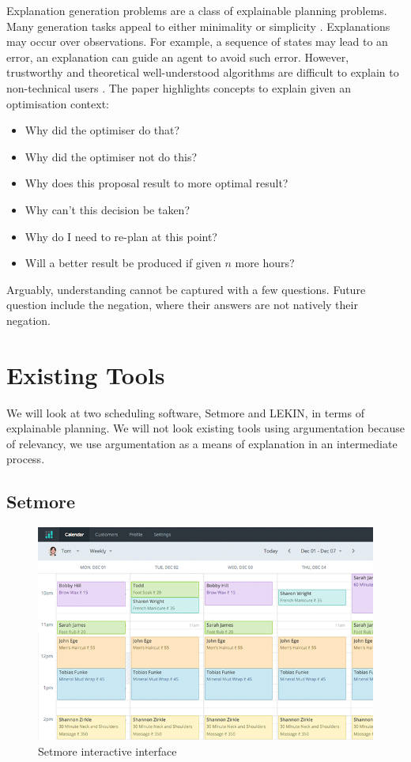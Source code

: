 Explanation generation problems are a class of explainable planning problems. Many generation tasks appeal to either minimality or simplicity \cite{pe}. Explanations may occur over observations. For example, a sequence of states may lead to an error, an explanation can guide an agent to avoid such error. However, trustworthy and theoretical well-understood algorithms are difficult to explain to non-technical users \cite{ep}. The paper highlights concepts to explain given an optimisation context:
\begin{itemize}
	\item Why did the optimiser do that?
	\item Why did the optimiser not do this?
	\item Why does this proposal result to more optimal result?
	\item Why can't this decision be taken?
	\item Why do I need to re-plan at this point?
	\item Will a better result be produced if given $n$ more hours?
\end{itemize}

Arguably, understanding cannot be captured with a few questions. Future question include the negation, where their answers are not natively their negation.

\section{Existing Tools}

We will look at two scheduling software, Setmore and LEKIN, in terms of explainable planning. We will not look existing tools using argumentation because of relevancy, we use argumentation as a means of explanation in an intermediate process.

\subsection{Setmore}

\begin{figure}[H]
	\begin{center}
		\includegraphics[width=\linewidth]{figures/setmore_gui.png}
	\end{center}
	\caption{Setmore interactive interface \cite{setmore}}
\end{figure}

